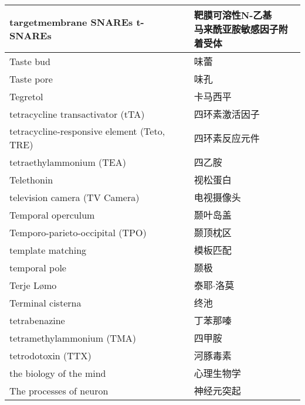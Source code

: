 \begin{longtable}{lll}
	\midrule
	targetmembrane SNAREs t-SNAREs && 	\makecell{靶膜可溶性N-乙基\\马来酰亚胺敏感因子附着受体}  \\
	
	\midrule
	Taste bud   && 	味蕾  \\
	
	\midrule
	Taste pore   && 	味孔  \\
	
	\midrule
	Tegretol   && 	卡马西平  \\
	
	\midrule
	tetracycline transactivator (tTA)   && 四环素激活因子  \\
	
	\midrule
	tetracycline-responsive element (Teto, TRE)  && 四环素反应元件  \\
	
	\midrule
	tetraethylammonium (TEA)   && 四乙胺  \\
	
	\midrule
	Telethonin   && 视松蛋白  \\
	
	\midrule
	television camera (TV Camera)   && 电视摄像头  \\
	
	\midrule
	Temporal operculum   && 颞叶岛盖  \\
	
	\midrule
	Temporo-parieto-occipital (TPO)   && 颞顶枕区  \\
	
	\midrule
	template matching   && 模板匹配  \\
	
	\midrule
	temporal pole   && 颞极  \\
	
	\midrule
	Terje Lømo   && 泰耶$\cdot$洛莫  \\
	
	\midrule
	Terminal cisterna   && 终池  \\
	
	\midrule
	tetrabenazine  && 丁苯那嗪  \\
	
	\midrule
	tetramethylammonium (TMA)  && 四甲胺  \\
	
	\midrule
	tetrodotoxin (TTX)   && 河豚毒素  \\
	
	\midrule
	the biology of the mind   && 心理生物学  \\
	
	\midrule
	The processes of neuron   && 神经元突起 \\
	

\end{longtable}
